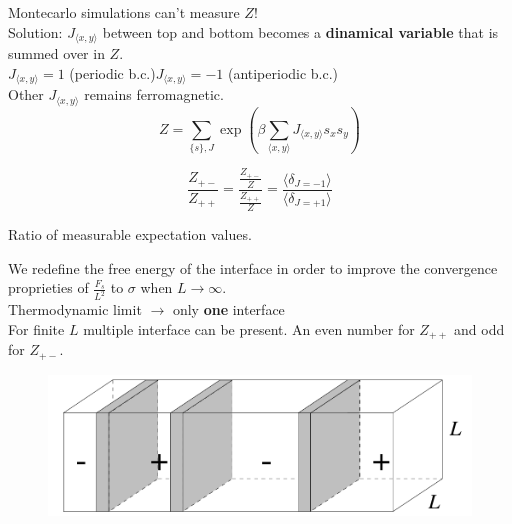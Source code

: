 \documentclass[12pt,handout]{beamer}
\begin{document}
\begin{frame}
\begin{center}
{\Large Montecarlo simulations can't measure $Z$!\\}
\vspace{10pt}
Solution: $J_{\langle x, y \rangle}$ between top and bottom becomes a \textbf{dinamical variable} that is summed over in $Z$.\\
$J_{\langle x, y \rangle} = 1$ (periodic b.c.)\hspace{10pt}$J_{\langle x, y \rangle} = -1$ (antiperiodic b.c.)\\
Other $J_{\langle x, y \rangle}$ remains ferromagnetic.
\[
Z = \sum_{\lbrace s \rbrace, J} \exp \left( \beta \sum_{\langle x, y \rangle} J_{\langle x, y \rangle} s_x s_y \right)
\]

{\large \[
\frac{Z_{+-}}{Z_{++}} = \frac{\frac{Z_{+-}}{Z}}{\frac{Z_{++}}{Z}}=\frac{\langle \delta_{J = -1} \rangle}{\langle \delta_{J = + 1} \rangle}
\]}

Ratio of measurable expectation values.
\end{center}
\end{frame}

\begin{frame}
\begin{center}
We redefine the free energy of the interface in order to improve the convergence proprieties of $\frac{F_s}{L^2}$ to $\sigma$ when $L \rightarrow \infty$.\\
\vspace{10pt}
Thermodynamic limit {\Large $\rightarrow$} only \textbf{one} interface\\
For finite $L$ multiple interface can be present. An even number for $Z_{++}$ and odd for $Z_{+-}$.\\

\begin{figure}[!htb]
\centering
\includegraphics[scale=0.3]{multiple.png}
\end{figure}

\end{center}
\end{frame}
\end{document}
